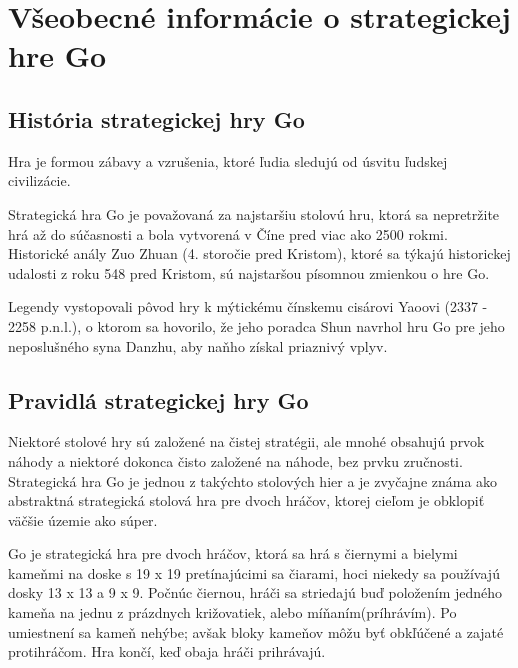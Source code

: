 \documentclass[10pt,twoside,slovak,a4paper]{article}
\begin{document}


\section{Všeobecné informácie o strategickej hre Go}
\subsection{História strategickej hry Go}
Hra je formou zábavy a vzrušenia, ktoré ľudia sledujú od úsvitu ľudskej civilizácie.\cite{9231758}

Strategická hra Go je považovaná za najstaršiu stolovú hru, ktorá sa nepretržite hrá až do súčasnosti a bola vytvorená v Číne pred viac ako 2500 rokmi. Historické anály Zuo Zhuan (4. storočie pred Kristom), ktoré sa týkajú historickej udalosti z roku 548 pred Kristom, sú najstaršou písomnou zmienkou o hre Go.\cite{9231758} 

Legendy vystopovali pôvod hry k mýtickému čínskemu cisárovi Yaoovi (2337 - 2258 p.n.l.), o ktorom sa hovorilo, že jeho poradca Shun navrhol hru Go pre jeho neposlušného syna Danzhu, aby naňho získal priaznivý vplyv.\cite{9231758}

\subsection{Pravidlá strategickej hry Go}\label{Pravidlá strategickej hry Go}
Niektoré stolové hry sú založené na čistej stratégii, ale mnohé obsahujú prvok náhody a niektoré dokonca čisto založené na náhode, bez prvku zručnosti. Strategická hra Go je jednou z takýchto stolových hier a je zvyčajne známa ako abstraktná strategická stolová hra pre dvoch hráčov, ktorej cieľom je obklopiť väčšie územie ako súper.\cite{9231758}

Go je strategická hra pre dvoch hráčov, ktorá sa hrá s čiernymi a bielymi kameňmi na doske s 19 x 19 pretínajúcimi sa čiarami, hoci niekedy sa používajú dosky 13 x 13 a 9 x 9. Počnúc čiernou, hráči sa striedajú buď položením jedného kameňa na jednu z prázdnych križovatiek, alebo míňaním(príhrávím). Po umiestnení sa kameň nehýbe; avšak bloky kameňov môžu byť obkľúčené a zajaté protihráčom. Hra končí, keď obaja hráči prihrávajú.\cite{10.1145/792548.611939}
\end{document}
